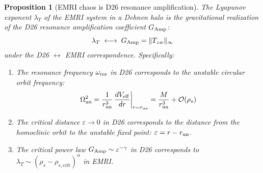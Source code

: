 \documentclass[
]{article}
\newtheorem{proposition}[theorem]{Proposition}
\begin{document}
\begin{proposition}[EMRI chaos is D26 resonance amplification]\label{prop:emri-chaos-resonance}
The Lyapunov exponent $\lambda_T$ of the EMRI system in a Dehnen halo is the gravitational realization of the D26 resonance amplification coefficient $G_{\rm Amp}$:
\begin{equation}
\lambda_T \;\longleftrightarrow\; G_{\rm Amp} = \|T_{zw}\|_\infty
\end{equation}
under the D26 $\leftrightarrow$ EMRI correspondence. Specifically:
\begin{enumerate}
\item The resonance frequency $\omega_{\rm res}$ in D26 corresponds to the unstable circular orbit frequency:
\begin{equation}\label{eq:omega_un}
\Omega_{\rm un}^2 = \frac{1}{r_{\rm un}^3}\,\frac{dV_{\rm eff}}{dr}\bigg|_{r=r_{\rm un}} = \frac{M}{r_{\rm un}^3} + \mathcal{O}(\rho_s)
\end{equation}
\item The critical distance $\varepsilon \to 0$ in D26 corresponds to the distance from the homoclinic orbit to the unstable fixed point: $\varepsilon = r - r_{\rm un}$.
\item The critical power law $G_{\rm Amp} \sim \varepsilon^{-\gamma}$ in D26 corresponds to $\lambda_T \sim (\rho_s - \rho_{s,\text{crit}})^\alpha$ in EMRI.
\end{enumerate}
\end{proposition}
\end{document}
